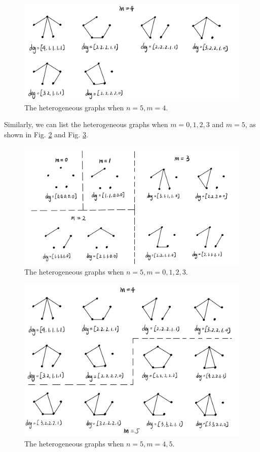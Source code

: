 \documentclass{oxmathproblems}
\makeatletter
\theoremstyle{definition}
\renewenvironment{solution}[1][Solution] {\par\pushQED{\qed}\normalfont\topsep6\p@\@plus6\p@\relax\trivlist\item[\hskip\labelsep\bfseries#1\@addpunct{.}]\ignorespaces}{\popQED\endtrivlist\@endpefalse} \makeatother
\makeatother
\begin{document}
\begin{solution}
	\begin{figure}[htbp]
		\centering
		\includegraphics[width=0.8\linewidth]{3.png}
		\caption{The heterogeneous graphs when $n = 5, m = 4$.}
		\label{fig3}
	\end{figure}

	Similarly, we can list the heterogeneous graphs when $m = 0, 1, 2, 3$ and $m = 5$, as shown in Fig. \ref{fig4} and Fig. \ref{fig5}.

	\begin{figure}[htbp]
		\centering
		\includegraphics[width=0.8\linewidth]{4.png}
		\caption{The heterogeneous graphs when $n = 5, m = 0, 1, 2, 3$.}
		\label{fig4}
	\end{figure}

	\begin{figure}[htbp]
		\centering
		\includegraphics[width=0.8\linewidth]{5.png}
		\caption{The heterogeneous graphs when $n = 5, m = 4, 5$.}
		\label{fig5}
	\end{figure}


\end{solution}
\end{document}
